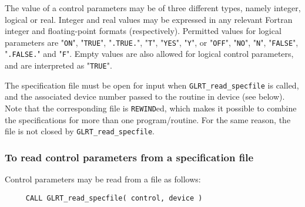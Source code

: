 \documentclass{galahad}
\newcommand{\packagename}{GL\-RT}
\begin{document}
The value of a control parameters may be of three different types, namely
integer, logical or real.
Integer and real values may be expressed in any relevant Fortran integer and
floating-point formats (respectively). Permitted values for logical
parameters are "{\tt ON}", "{\tt TRUE}", "{\tt .TRUE.}", "{\tt T}",
"{\tt YES}", "{\tt Y}", or "{\tt OFF}", "{\tt NO}",
"{\tt N}", "{\tt FALSE}", "{\tt .FALSE.}" and "{\tt F}".
Empty values are also allowed for
logical control parameters, and are interpreted as "{\tt TRUE}".

The specification file must be open for
input when {\tt \packagename\_read\_specfile}
is called, and the associated device number
passed to the routine in device (see below).
Note that the corresponding
file is {\tt REWIND}ed, which makes it possible to combine the specifications
for more than one program/routine.  For the same reason, the file is not
closed by {\tt \packagename\_read\_specfile}.

\subsubsection{To read control parameters from a specification file}
\label{readspec}

Control parameters may be read from a file as follows:
\hskip0.5in
\def\baselinestretch{0.8} {\tt \begin{verbatim}
     CALL GLRT_read_specfile( control, device )
\end{verbatim}}
\def\baselinestretch{1.0}
\end{document}
